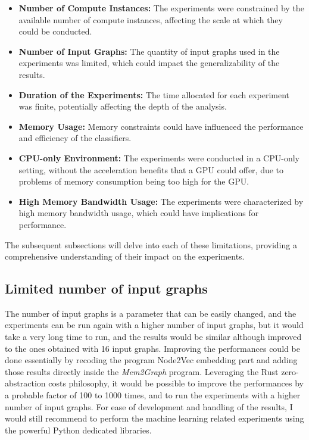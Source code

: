 \begin{itemize}
    \item \textbf{Number of Compute Instances:} The experiments were constrained by the available number of compute instances, affecting the scale at which they could be conducted.
    
    \item \textbf{Number of Input Graphs:} The quantity of input graphs used in the experiments was limited, which could impact the generalizability of the results.
    
    \item \textbf{Duration of the Experiments:} The time allocated for each experiment was finite, potentially affecting the depth of the analysis.
    
    \item \textbf{Memory Usage:} Memory constraints could have influenced the performance and efficiency of the classifiers.
    
    \item \textbf{CPU-only Environment:} The experiments were conducted in a CPU-only setting, without the acceleration benefits that a GPU could offer, due to problems of memory consumption being too high for the GPU.
    
    \item \textbf{High Memory Bandwidth Usage:} The experiments were characterized by high memory bandwidth usage, which could have implications for performance.
\end{itemize}

The subsequent subsections will delve into each of these limitations, providing a comprehensive understanding of their impact on the experiments.

\subsection{Limited number of input graphs}
The number of input graphs is a parameter that can be easily changed, and the experiments can be run again with a higher number of input graphs, but it would take a very long time to run, and the results would be similar although improved to the ones obtained with 16 input graphs. Improving the performances could be done essentially by recoding the program Node2Vec embedding part and adding those results directly inside the \textit{Mem2Graph} program. Leveraging the Rust zero-abstraction costs philosophy, it would be possible to improve the performances by a probable factor of 100 to 1000 times, and to run the experiments with a higher number of input graphs. For ease of development and handling of the results, I would still recommend to perform the machine learning related experiments using the powerful Python dedicated libraries.

